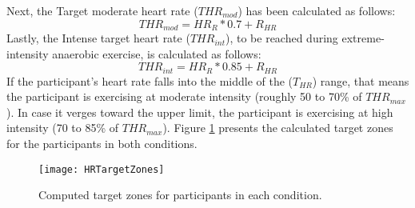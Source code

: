 Next, the Target moderate heart rate (\begin{math} THR_{mod}\end{math}) has been calculated as follows:\begin{equation}
THR_{mod} =  HR_{R}*0.7 + R_{HR} 
\end{equation}Lastly, the Intense target heart rate (\begin{math} THR_{int}\end{math}), to be reached during extreme-intensity anaerobic exercise, is calculated as follows: 
\begin{equation}
THR_{int} =  HR_{R}*0.85 + R_{HR} 
\end{equation} If the participant's heart rate falls into the middle of the (\begin{math} T_{HR}\end{math}) range, that means the participant is exercising at moderate intensity (roughly 50 to 70\% of \begin{math} THR_{max}\end{math}). In case it verges toward the upper limit, the participant is exercising at high intensity (70 to 85\% of \begin{math} THR_{max}\end{math}). Figure \ref{fig:hrZones} presents the calculated target zones for the participants in both conditions.\\
\begin{figure}[h]
    \centering
    \texttt{[image: HRTargetZones]}
    \caption{Computed target zones for participants in each condition.}
    \label{fig:hrZones}
\end{figure}\\
